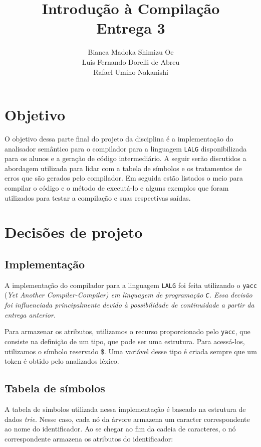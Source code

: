 \documentclass{article}
\title{Introdução à Compilação\\Entrega 3}
\author{Bianca Madoka Shimizu Oe\\
		Luis Fernando Dorelli de Abreu\\
		Rafael Umino Nakanishi}
\date{}
\begin{document}
\maketitle

\section{Objetivo} %
\label{sec:objetivo}
	O objetivo dessa parte final do projeto da disciplina é a implementação do analisador semântico para o compilador para a linguagem \verb=LALG= disponibilizada para os alunos e a geração de código intermediário. A seguir serão discutidos a abordagem utilizada para lidar com a tabela de símbolos e os tratamentos de erros que são gerados pelo compilador. Em seguida estão listados o meio para compilar o código e o método de executá-lo e alguns exemplos que foram utilizados para testar a compilação e suas respectivas saídas.


\section{Decisões de projeto} %
\label{sec:decisoes_de_projeto}
	\subsection{Implementação} %
	\label{sub:implementacao}
		A implementação do compilador para a linguagem \verb=LALG= foi feita utilizando o \verb=yacc= (\em Yet Another Compiler-Compiler\normalfont) em linguagem de programação \verb=C=. Essa decisão foi influenciada principalmente devido à possibilidade de continuidade a partir da entrega anterior. 

		Para armazenar os atributos, utilizamos o recurso proporcionado pelo \verb=yacc=, que consiste na definição de um tipo, que pode ser uma estrutura. Para acessá-los, utilizamos o símbolo reservado \$. Uma variável desse tipo é criada sempre que um token é obtido pelo analizados léxico.
		

	\subsection{Tabela de símbolos} %
	\label{sub:tabela_de_simbolos}
		A tabela de símbolos utilizada nessa implementação é baseado na estrutura de dados \emph{trie}. Nesse caso, cada nó da árvore armazena um caracter correspondente ao nome do identificador. Ao se chegar ao fim da cadeia de caracteres, o nó correspondente armazena os atributos do identificador:
\end{document}
